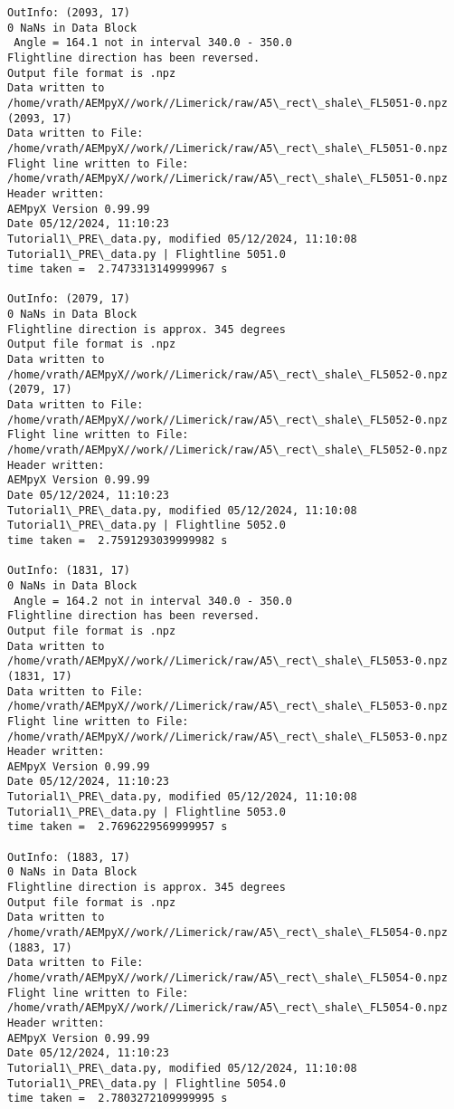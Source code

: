 \documentclass[11pt]{article}
\begin{document}
\begin{Verbatim}[commandchars=\\\{\}]
OutInfo: (2093, 17)
0 NaNs in Data Block
 Angle = 164.1 not in interval 340.0 - 350.0
Flightline direction has been reversed.
Output file format is .npz
Data written to
/home/vrath/AEMpyX//work//Limerick/raw/A5\_rect\_shale\_FL5051-0.npz
(2093, 17)
Data written to File:
/home/vrath/AEMpyX//work//Limerick/raw/A5\_rect\_shale\_FL5051-0.npz
Flight line written to File:
/home/vrath/AEMpyX//work//Limerick/raw/A5\_rect\_shale\_FL5051-0.npz
Header written:
AEMpyX Version 0.99.99
Date 05/12/2024, 11:10:23
Tutorial1\_PRE\_data.py, modified 05/12/2024, 11:10:08
Tutorial1\_PRE\_data.py | Flightline 5051.0
time taken =  2.7473313149999967 s

OutInfo: (2079, 17)
0 NaNs in Data Block
Flightline direction is approx. 345 degrees
Output file format is .npz
Data written to
/home/vrath/AEMpyX//work//Limerick/raw/A5\_rect\_shale\_FL5052-0.npz
(2079, 17)
Data written to File:
/home/vrath/AEMpyX//work//Limerick/raw/A5\_rect\_shale\_FL5052-0.npz
Flight line written to File:
/home/vrath/AEMpyX//work//Limerick/raw/A5\_rect\_shale\_FL5052-0.npz
Header written:
AEMpyX Version 0.99.99
Date 05/12/2024, 11:10:23
Tutorial1\_PRE\_data.py, modified 05/12/2024, 11:10:08
Tutorial1\_PRE\_data.py | Flightline 5052.0
time taken =  2.7591293039999982 s

OutInfo: (1831, 17)
0 NaNs in Data Block
 Angle = 164.2 not in interval 340.0 - 350.0
Flightline direction has been reversed.
Output file format is .npz
Data written to
/home/vrath/AEMpyX//work//Limerick/raw/A5\_rect\_shale\_FL5053-0.npz
(1831, 17)
Data written to File:
/home/vrath/AEMpyX//work//Limerick/raw/A5\_rect\_shale\_FL5053-0.npz
Flight line written to File:
/home/vrath/AEMpyX//work//Limerick/raw/A5\_rect\_shale\_FL5053-0.npz
Header written:
AEMpyX Version 0.99.99
Date 05/12/2024, 11:10:23
Tutorial1\_PRE\_data.py, modified 05/12/2024, 11:10:08
Tutorial1\_PRE\_data.py | Flightline 5053.0
time taken =  2.7696229569999957 s

OutInfo: (1883, 17)
0 NaNs in Data Block
Flightline direction is approx. 345 degrees
Output file format is .npz
Data written to
/home/vrath/AEMpyX//work//Limerick/raw/A5\_rect\_shale\_FL5054-0.npz
(1883, 17)
Data written to File:
/home/vrath/AEMpyX//work//Limerick/raw/A5\_rect\_shale\_FL5054-0.npz
Flight line written to File:
/home/vrath/AEMpyX//work//Limerick/raw/A5\_rect\_shale\_FL5054-0.npz
Header written:
AEMpyX Version 0.99.99
Date 05/12/2024, 11:10:23
Tutorial1\_PRE\_data.py, modified 05/12/2024, 11:10:08
Tutorial1\_PRE\_data.py | Flightline 5054.0
time taken =  2.7803272109999995 s


\end{Verbatim}
\end{document}
